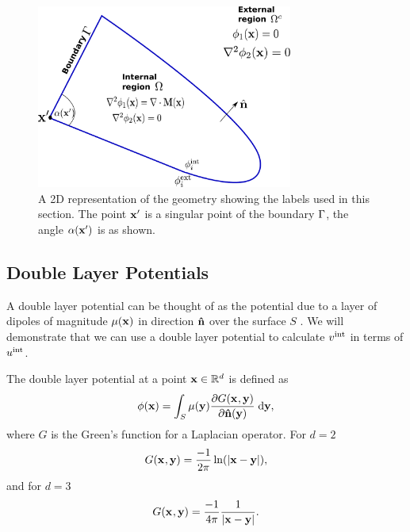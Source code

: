 \begin{figure}
  \center
  \includegraphics[width=0.75\textwidth]{./images/BEM-geometry}




  \caption{A 2D representation of the geometry showing the labels used in this section. The point $\mathbf{x}'$ is a singular point of the boundary ${\Gamma}$, the angle $\alpha(\mathbf{x}')$ is as shown.}
  \label{fig:BEM-geometry}
\end{figure}

\subsection{Double Layer Potentials}
\label{sec:double-layer-potent}
A double layer potential can be thought of as the potential due to a layer of dipoles of magnitude $\mu(\mathbf{x})$ in direction $\mathbf{\hat{n}}$ over the surface $S$ \cite{Sternberg1946}. We will demonstrate that we can use a double layer potential to calculate $v^{\text{int}}$ in terms of $u^{\text{int}}$.

The double layer potential at a point $\mathbf{x} \in \mathbb{R}^d$ is defined as \cite{eom_double_layer_potential}
\begin{equation}
  \label{eq:3}
  \phi(\mathbf{x}) = \int_{S} \mu(\mathbf{y}) \frac{\partial G(\mathbf{x}_{},\mathbf{y})}{\partial \mathbf{\hat{n}}(\mathbf{y})} {\; \text{d}} \mathbf{y},
\end{equation}
where $G$ is the Green's function for a Laplacian operator.
For $d=2$
\[ G(\mathbf{x}_{},\mathbf{y}) = \dfrac{-1}{2\pi}\ln(\left|{\mathbf{x} - \mathbf{y}} \right|), \]
and for $d=3$
\begin{equation} G(\mathbf{x}_{},\mathbf{y}) = \dfrac{-1}{4 \pi} \dfrac{1}{\left|{\mathbf{x} - \mathbf{y}} \right|}.
  \label{eqn:greenslaplacian3d}
\end{equation}


